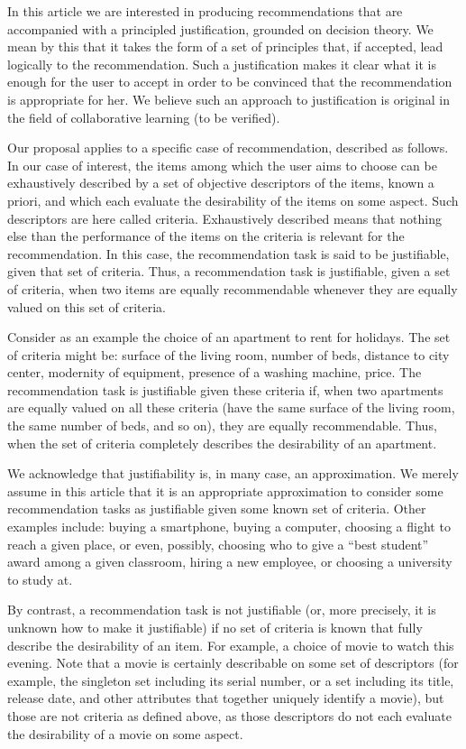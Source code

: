 \documentclass[version=last, pagesize, twoside=off, bibliography=totoc, DIV=calc, fontsize=14pt, a4paper, french, english]{scrartcl}
\begin{document}
In this article we are interested in producing recommendations that are accompanied with a principled justification, grounded on decision theory. We mean by this that it takes the form of a set of principles that, if accepted, lead logically to the recommendation. Such a justification makes it clear what it is enough for the user to accept in order to be convinced that the recommendation is appropriate for her. We believe such an approach to justification is original in the field of collaborative learning (to be verified).

Our proposal applies to a specific case of recommendation, described as follows. In our case of interest, the items among which the user aims to choose can be exhaustively described by a set of objective descriptors of the items, known a priori, and which each evaluate the desirability of the items on some aspect. Such descriptors are here called criteria. Exhaustively described means that nothing else than the performance of the items on the criteria is relevant for the recommendation. In this case, the recommendation task is said to be justifiable, given that set of criteria. Thus, a recommendation task is justifiable, given a set of criteria, when two items are equally recommendable whenever they are equally valued on this set of criteria.

Consider as an example the choice of an apartment to rent for holidays. The set of criteria might be: surface of the living room, number of beds, distance to city center, modernity of equipment, presence of a washing machine, price. The recommendation task is justifiable given these criteria if, when two apartments are equally valued on all these criteria (have the same surface of the living room, the same number of beds, and so on), they are equally recommendable. Thus, when the set of criteria completely describes the desirability of an apartment.

We acknowledge that justifiability is, in many case, an approximation. We merely assume in this article that it is an appropriate approximation to consider some recommendation tasks as justifiable given some known set of criteria. Other examples include: buying a smartphone, buying a computer, choosing a flight to reach a given place, or even, possibly, choosing who to give a “best student” award among a given classroom, hiring a new employee, or choosing a university to study at.

By contrast, a recommendation task is not justifiable (or, more precisely, it is unknown how to make it justifiable) if no set of criteria is known that fully describe the desirability of an item. For example, a choice of movie to watch this evening. Note that a movie is certainly describable on some set of descriptors (for example, the singleton set including its serial number, or a set including its title, release date, and other attributes that together uniquely identify a movie), but those are not criteria as defined above, as those descriptors do not each evaluate the desirability of a movie on some aspect.
\end{document}
